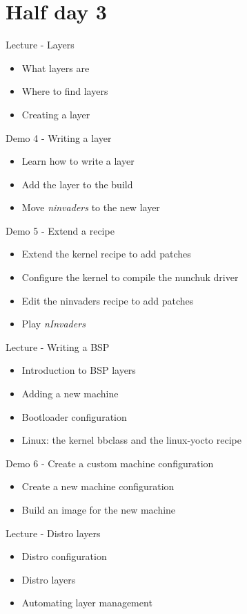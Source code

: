 \documentclass[a4paper,12pt,obeyspaces,spaces,hyphens]{article}
\begin{document}
\section{Half day 3}

\feagendatwocolumn
{Lecture - Layers}
{
  \begin{itemize}
  \item What layers are
  \item Where to find layers
  \item Creating a layer
  \end{itemize}
}
{Demo 4 - Writing a layer}
{
  \begin{itemize}
  \item Learn how to write a layer
  \item Add the layer to the build
  \item Move {\em ninvaders} to the new layer
  \end{itemize}
}

\feagendaonecolumn
{Demo 5 - Extend a recipe}
{
  \begin{itemize}
  \item Extend the kernel recipe to add patches
  \item Configure the kernel to compile the nunchuk driver
  \item Edit the ninvaders recipe to add patches
  \item Play {\em nInvaders}
  \end{itemize}
}

\feagendatwocolumn
{Lecture - Writing a BSP}
{
  \begin{itemize}
  \item Introduction to BSP layers
  \item Adding a new machine
  \item Bootloader configuration
  \item Linux: the kernel bbclass and the linux-yocto recipe
  \end{itemize}
}
{Demo 6 - Create a custom machine configuration}
{
  \begin{itemize}
  \item Create a new machine configuration
  \item Build an image for the new machine
  \end{itemize}
}

\feagendaonecolumn
{Lecture - Distro layers}
{
  \begin{itemize}
  \item Distro configuration
  \item Distro layers
  \item Automating layer management
  \end{itemize}
}
\end{document}
